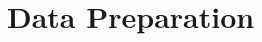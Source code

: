 \documentclass{template}
\begin{document}
\newpage









    

\chapter{Data Preparation}\label{ch:lr}
\end{document}
